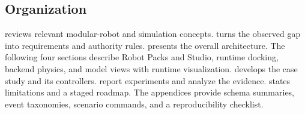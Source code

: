 \subsection{Organization}

 reviews relevant modular-robot and simulation concepts.
 turns the observed gap into requirements and authority rules.
 presents the overall architecture. The following four sections
describe Robot Packs and Studio, runtime docking, backend physics, and model views with
runtime visualization.  develops the \smoresep{} case study and its
controllers.  report experiments and analyze the
evidence.  states limitations and a staged roadmap. The appendices
provide schema summaries, event taxonomies, scenario commands, and a reproducibility
checklist.

